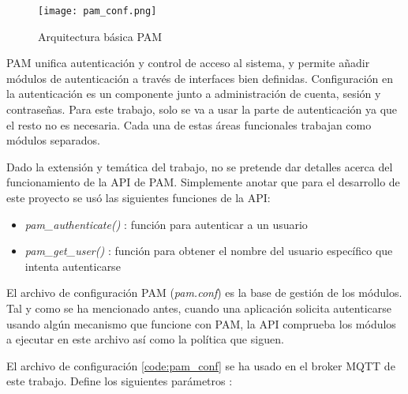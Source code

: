 \begin{figure}[H]
    \centering
    \texttt{[image: pam\_conf.png]}
    \caption{Arquitectura básica PAM}
\end{figure}

PAM unifica autenticación y control de acceso al sistema, y permite añadir módulos de autenticación a través de interfaces bien 
definidas. Configuración en la autenticación es un componente junto a administración de cuenta, sesión y contraseñas. Para este 
trabajo, solo se va a usar la parte de autenticación ya que el resto no es necesaria. Cada una de estas áreas funcionales trabajan 
como módulos separados.

Dado la extensión y temática del trabajo, no se pretende dar detalles acerca del funcionamiento de la API de PAM. Simplemente 
anotar que para el desarrollo de este proyecto se usó las siguientes funciones de la API:

\begin{itemize}
    \item \textit{pam\_authenticate()} \cite{pam_sm_authenticate3}: función para autenticar a un usuario
    \item \textit{pam\_get\_user()} \cite{pam_get_user3}: función para obtener el nombre del usuario específico que intenta autenticarse
\end{itemize}

El archivo de configuración PAM (\textit{pam.conf}) es la base de gestión de los módulos. Tal y como se ha mencionado antes, 
cuando una aplicación solicita autenticarse usando algún mecanismo que funcione con PAM, la API comprueba los módulos a ejecutar
en este archivo así como la política que siguen.

El archivo de configuración \ref{code:pam_conf} se ha usado en el broker MQTT de este trabajo. Define los siguientes parámetros 
\cite{mosquittoconf_2021}:


